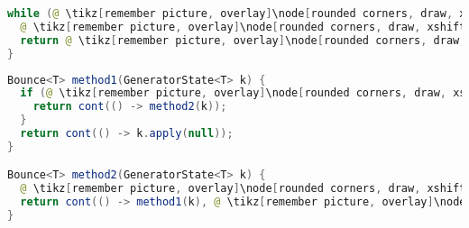 
\pagebreak

\begin{center}
\begin{mdframed}[topline=true]
\begin{minipage}[t]{0.4\textwidth}
\begin{lstlisting}[language=Java, numbers=none, breaklines=true]
while (@ \tikz[remember picture, overlay]\node[rounded corners, draw, xshift=-0.1cm, inner sep=5pt, anchor=west, yshift=0.1cm] {Feltétel}; \vspace*{0.3cm} \hspace*{1.14cm}@) {
  @ \tikz[remember picture, overlay]\node[rounded corners, draw, xshift=-0.1cm, inner sep=5pt, anchor=west] {Kódrészlet}; \vspace*{0.5cm} @ 
  return @ \tikz[remember picture, overlay]\node[rounded corners, draw, xshift=-0.1cm, inner sep=5pt, anchor=west, yshift=0.1cm] {Kifejezés}; \vspace*{0.3cm} @
}
\end{lstlisting}
\end{minipage} 
\begin{minipage}[t]{0.6\textwidth}
\begin{lstlisting}[language=Java, numbers=none, breaklines=true]
Bounce<T> method1(GeneratorState<T> k) {
  if (@ \tikz[remember picture, overlay]\node[rounded corners, draw, xshift=-0.1cm, inner sep=5pt, anchor=west, yshift=0.1cm] {Feltétel}; \hspace*{1.04cm} @) {
    return cont(() -> method2(k));
  }
  return cont(() -> k.apply(null));
}

Bounce<T> method2(GeneratorState<T> k) {
  @ \tikz[remember picture, overlay]\node[rounded corners, draw, xshift=-0.1cm, inner sep=5pt, anchor=west] {Kódrészlet}; \vspace*{0.3cm} @
  return cont(() -> method1(k), @ \tikz[remember picture, overlay]\node[rounded corners, draw, xshift=-0.1cm, inner sep=5pt, anchor=west, yshift=0.1cm] {Kifejezés}; \vspace*{0.2cm} \hspace*{1.2cm} @);
}
\end{lstlisting} 
\end{minipage}
\end{mdframed}
\end{center}

